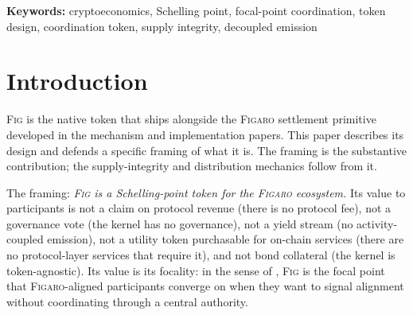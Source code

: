 \documentclass[11pt,a4paper]{article}
\theoremstyle{definition}
\theoremstyle{remark}
\newcommand{\figaro}{\textsc{Figaro}}
\newcommand{\fig}{\textsc{Fig}}
\begin{document}
\medskip
\noindent\textbf{Keywords:}
cryptoeconomics, Schelling point, focal-point coordination, token
design, coordination token, supply integrity, decoupled emission

\section{Introduction}
\label{sec:intro}

\fig{} is the native token that ships alongside the \figaro{}
settlement primitive developed
in the mechanism and implementation papers. This paper
describes its design and defends a specific framing of what it
is. The framing is the substantive contribution; the
supply-integrity and distribution mechanics follow from it.

The framing: \emph{\fig{} is a Schelling-point token for the
\figaro{} ecosystem.} Its value to participants is not a claim on
protocol revenue (there is no protocol fee), not a governance
vote (the kernel has no governance), not a yield stream (no
activity-coupled emission), not a utility token purchasable for
on-chain services (there are no protocol-layer services that
require it), and not bond collateral (the kernel is
token-agnostic). Its value is its focality: in the sense of
\citet{schelling1960strategy}, \fig{} is the focal point that
\figaro{}-aligned participants converge on when they want to
signal alignment without coordinating through a central authority.
\end{document}
